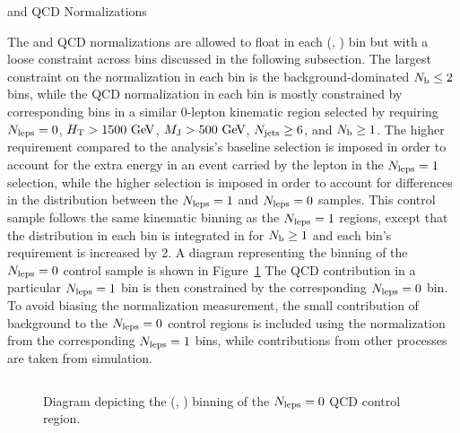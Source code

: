 \begin{section}{\ttbar and QCD Normalizations}

The \ttbar and QCD normalizations are allowed to float in each (\Njets, \MJ) bin but with a loose constraint across \MJ bins discussed in the following subsection.
The largest constraint on the \ttbar normalization in each bin is the background-dominated $N_\mathrm{b} \leq 2$ bins, while the QCD normalization in each bin is mostly constrained by corresponding bins in a similar 0-lepton kinematic region selected by requiring $N_{\mathrm{leps}} = 0$, $H_\mathrm{T} > 1500~\mathrm{Ge\kern -0.1em V}$, $M_\mathrm{J} > 500~\mathrm{Ge\kern -0.1em V}$, $N_{\mathrm{jets}} \geq 6$, and $N_\mathrm{b} \geq 1$.
The higher \HT requirement compared to the analysis's baseline selection is imposed in order to account for the extra energy in an event carried by the lepton in the $N_{\mathrm{leps}} = 1$ selection, while the higher \Njets selection is imposed in order to account for differences in the \Njets distribution between the $N_{\mathrm{leps}} = 1$ and $N_{\mathrm{leps}} = 0$ samples.
This control sample follows the same kinematic binning as the $N_{\mathrm{leps}} = 1$ regions, except that the \Nb distribution in each bin is integrated in \Nb for $N_\mathrm{b} \geq 1$ and each bin's \Njets requirement is increased by 2.
A diagram representing the binning of the $N_{\mathrm{leps}} = 0$ control sample is shown in Figure~\ref{fig:nlep0_regions}
The QCD contribution in a particular $N_{\mathrm{leps}} = 1$ bin is then constrained by the corresponding $N_{\mathrm{leps}} = 0$ bin.
To avoid biasing the normalization measurement, the small contribution of \ttbar background to the $N_{\mathrm{leps}} = 0$ control regions is included using the normalization from the corresponding $N_{\mathrm{leps}} = 1$ bins, while contributions from other processes are taken from simulation.

\begin{figure}[tbp!]
\centering
\begin{tabular}{ |c|c|c|c| }
\hline
\end{tabular}
\caption{Diagram depicting the (\Njets, \MJ) binning of the $N_{\mathrm{leps}} = 0$ QCD control region.}
\label{fig:nlep0_regions}
\end{figure}


\end{section}
